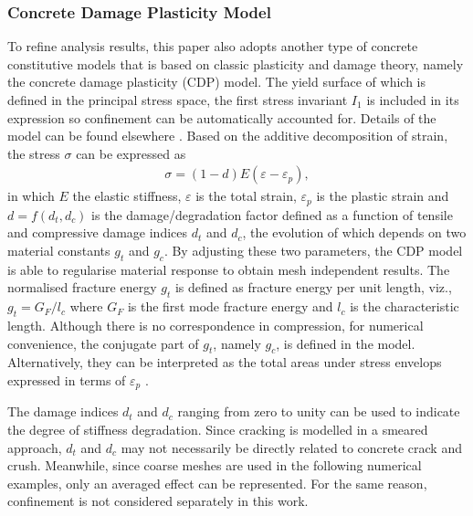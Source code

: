\documentclass[3p,review,sort&compress,11pt,fleqn]{elsarticle}
\begin{document}
\subsubsection{Concrete Damage Plasticity Model}
To refine analysis results, this paper also adopts another type of concrete constitutive models that is based on classic plasticity and damage theory, namely the concrete damage plasticity (CDP) model. The yield surface of which is defined in the principal stress space, the first stress invariant $I_1$ is included in its expression so confinement can be automatically accounted for. Details of the model can be found elsewhere \citep{Lee1998}. Based on the additive decomposition of strain, the stress $\sigma$ can be expressed as
\begin{gather*}
\sigma=\left(1-d\right)E\left(\varepsilon-\varepsilon_p\right),
\end{gather*}
in which $E$ the elastic stiffness, $\varepsilon$ is the total strain, $\varepsilon_p$ is the plastic strain and $d=f(d_t,d_c)$ is the damage/degradation factor defined as a function of tensile and compressive damage indices $d_t$ and $d_c$, the evolution of which depends on two material constants $g_t$ and $g_c$. By adjusting these two parameters, the CDP model is able to regularise material response to obtain mesh independent results. The normalised fracture energy $g_t$ is defined as fracture energy per unit length, viz., $g_t=G_F/l_c$ where $G_F$ is the first mode fracture energy and $l_c$ is the characteristic length. Although there is no correspondence in compression, for numerical convenience, the conjugate part of $g_t$, namely $g_c$, is defined in the model. Alternatively, they can be interpreted as the total areas under stress envelops expressed in terms of $\varepsilon_p$ \citep{Lubliner1989}.

The damage indices $d_t$ and $d_c$ ranging from zero to unity can be used to indicate the degree of stiffness degradation. Since cracking is modelled in a smeared approach, $d_t$ and $d_c$ may not necessarily be directly related to concrete crack and crush. Meanwhile, since coarse meshes are used in the following numerical examples, only an averaged effect can be represented. For the same reason, confinement is not considered separately in this work.
\end{document}
